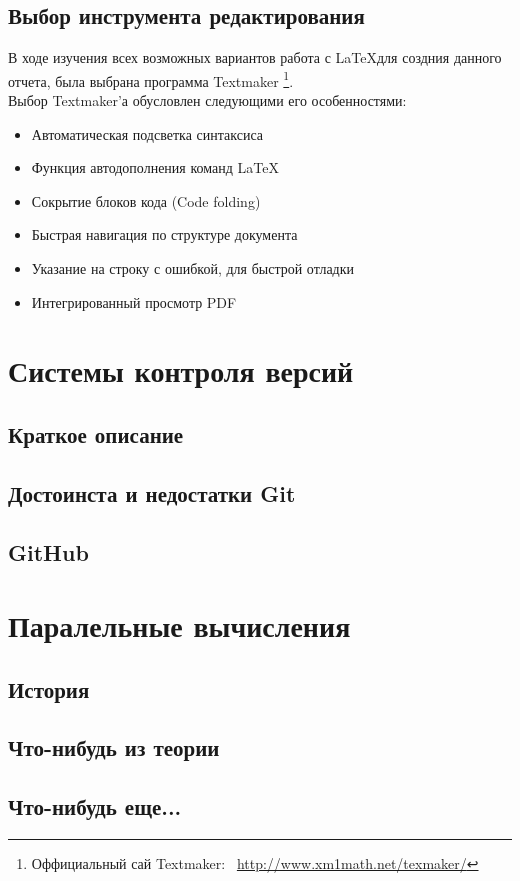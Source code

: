 \documentclass{article}
\begin{document}
		\subsection{Выбор инструмента редактирования}
			В ходе изучения всех возможных вариантов работа с \LaTeX для создния данного отчета, была выбрана программа Textmaker				\footnote{Оффициальный сай Textmaker:~ \href{http://www.xm1math.net/texmaker/}{http://www.xm1math.net/texmaker/}}.\\
		Выбор Textmaker'а обусловлен следующими его особенностями:
			\begin{itemize} 
	    		\item	Автоматическая подсветка синтаксиса
	    		\item	Функция автодополнения команд \LaTeX
	    		\item	Сокрытие блоков кода (Code folding)
	    		\item	Быстрая навигация по структуре документа
	    		\item	Указание на строку с ошибкой, для быстрой отладки
	    		\item	Интегрированный просмотр PDF
			\end{itemize} 
	\newpage
	\section{Системы контроля версий}
		\subsection{Краткое описание}
		\subsection{Достоинста и недостатки Git}
		\subsection{GitHub}
	\section{Паралельные вычисления}
		\subsection{История}
		\subsection{Что-нибудь из теории}
		\subsection{Что-нибудь еще...}
	\newpage
\end{document}

